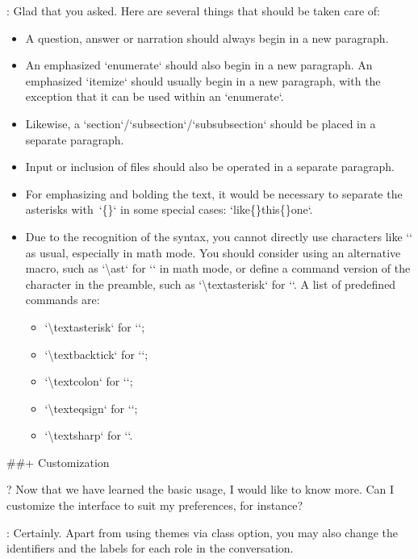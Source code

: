 \documentclass[%
  use style = classical,
  scroll,
]{Q-and-A}
\begin{document}
:
  Glad that you asked. Here are several things that should be taken care of:
  \begin{itemize}
    \item A question, answer or narration should always begin in a new paragraph.
    \item An emphasized `enumerate` should also begin in a new paragraph. An emphasized `itemize` should usually begin in a new paragraph, with the exception that it can be used within an `enumerate`.
    \item Likewise, a `section`/`subsection`/`subsubsection` should be placed in a separate paragraph.
    \item Input or inclusion of files should also be operated in a separate paragraph.
    \item For emphasizing and bolding the text, it would be necessary to separate the asterisks with~`\{\}` in some special cases: `\textasterisk\textasterisk like\textasterisk\textasterisk\{\}\textasterisk\textasterisk\textasterisk this\textasterisk\textasterisk\textasterisk\{\}\textasterisk one\textasterisk`.
    \item Due to the recognition of the syntax, you cannot directly use characters like `\textasterisk` as usual, especially in math mode. You should consider using an alternative macro, such as `\backslash ast` for `\textasterisk` in math mode, or define a command version of the character in the preamble, such as `\backslash textasterisk` for `\textasterisk`. A list of predefined commands are:
    \begin{itemize}
      \item `\backslash textasterisk` for `\textasterisk`;
      \item `\backslash textbacktick` for `\textbacktick`;
      \item `\backslash textcolon` for `\textcolon`;
      \item `\backslash texteqsign` for `\texteqsign`;
      \item `\backslash textsharp` for `\textsharp`.
    \end{itemize}
  \end{itemize}


##+ {Customization}

?
  Now that we have learned the basic usage, I would like to know more. Can I customize the interface to suit my preferences, for instance?

:
  Certainly. Apart from using themes via class option, you may also change the identifiers and the labels for each role in the conversation.
\end{document}
